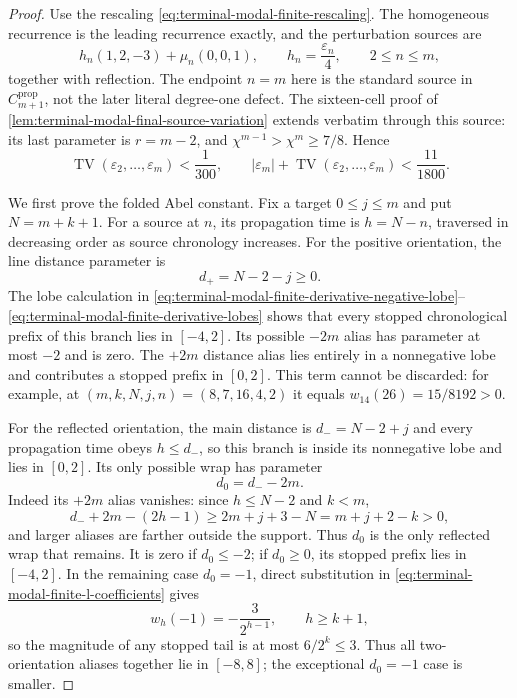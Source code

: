 \begin{proof}
Use the rescaling
\eqref{eq:terminal-modal-finite-rescaling}.  The homogeneous recurrence is
the leading recurrence exactly, and the perturbation sources are
\begin{equation}
 h_n(1,2,-3)+\mu_n(0,0,1),\qquad
 h_n=\frac{\varepsilon_n}{4},\qquad2\le n\le m,
 \label{eq:terminal-modal-finite-stopped-sources}
\end{equation}
together with reflection.  The endpoint $n=m$ here is the standard source
in $C_{m+1}^{\mathrm{prop}}$, not the later literal degree-one defect.
The sixteen-cell proof of
\cref{lem:terminal-modal-final-source-variation} extends verbatim through
this source: its last parameter is $r=m-2$, and
$\chi^{m-1}>\chi^m\ge7/8$.  Hence
\begin{equation}
 \operatorname{TV}(\varepsilon_2,\ldots,\varepsilon_m)<\frac1{300},
 \qquad
 |\varepsilon_m|+\operatorname{TV}(\varepsilon_2,\ldots,\varepsilon_m)
 <\frac{11}{1800}.
 \label{eq:terminal-modal-finite-stopped-epsilon-TV}
\end{equation}

We first prove the folded Abel constant.  Fix a target $0\le j\le m$ and
put $N=m+k+1$.  For a source at $n$, its propagation time is
$h=N-n$, traversed in decreasing order as source chronology increases.
For the positive orientation, the line distance parameter is
\begin{equation}
 d_+=N-2-j\ge0.
\end{equation}
The lobe calculation in
\eqref{eq:terminal-modal-finite-derivative-negative-lobe}--
\eqref{eq:terminal-modal-finite-derivative-lobes} shows that every stopped
chronological prefix of this branch lies in $[-4,2]$.  Its possible
$-2m$ alias has parameter at most $-2$ and is zero.  The $+2m$ distance
alias lies entirely in a nonnegative lobe and contributes a stopped prefix
in $[0,2]$.  This term cannot be discarded: for example, at
$(m,k,N,j,n)=(8,7,16,4,2)$ it equals
$w_{14}(26)=15/8192>0$.

For the reflected orientation, the main distance is
$d_-=N-2+j$ and every propagation time obeys $h\le d_-$, so this branch is
inside its nonnegative lobe and lies in $[0,2]$.  Its only possible wrap has
parameter
\begin{equation}
 d_0=d_--2m.
\end{equation}
Indeed its $+2m$ alias vanishes: since $h\le N-2$ and $k<m$,
\begin{equation}
 d_-+2m-(2h-1)\ge 2m+j+3-N=m+j+2-k>0,
\end{equation}
and larger aliases are farther outside the support.  Thus $d_0$ is the only
reflected wrap that remains.
It is zero if $d_0\le-2$; if $d_0\ge0$, its stopped prefix lies in
$[-4,2]$.  In the remaining case $d_0=-1$, direct substitution in
\eqref{eq:terminal-modal-finite-l-coefficients} gives
\begin{equation}
 w_h(-1)=-\frac3{2^{h-1}},\qquad h\ge k+1,
\end{equation}
so the magnitude of any stopped tail is at most
$6/2^k\le3$.  Thus all two-orientation aliases together lie in $[-8,8]$;
the exceptional $d_0=-1$ case is smaller.


\end{proof}
